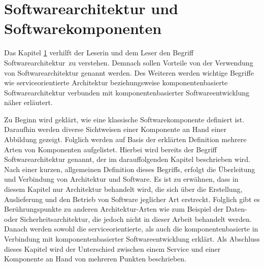 \section{Softwarearchitektur und Softwarekomponenten}
\label{sec:2_Architektur}
Das Kapitel \ref{sec:2_Architektur} verhilft der Leserin und dem Leser den Begriff \glqq Softwarearchitektur\grqq\ zu verstehen. Demnach sollen Vorteile von der Verwendung von Softwarearchitektur genannt werden. Des Weiteren werden wichtige Begriffe wie serviceorientierte Architektur beziehungsweise komponentenbasierte Softwarearchitektur verbunden mit komponentenbasierter Softwareentwicklung näher erläutert.

Zu Beginn wird geklärt, wie eine klassische Softwarekomponente definiert ist. Daraufhin werden diverse Sichtweisen einer Komponente an Hand einer Abbildung gezeigt. Folglich werden auf Basis der erklärten Definition mehrere Arten von Komponenten aufgelistet. Hierbei wird bereits der Begriff Softwarearchitektur genannt, der im darauffolgenden Kapitel beschrieben wird. Nach einer kurzen, allgemeinen Definition dieses Begriffs, erfolgt die Überleitung und Verbindung von Architektur und Software. Es ist zu erwähnen, dass in diesem Kapitel nur Architektur behandelt wird, die sich über die Erstellung, Auslieferung und den Betrieb von Software jeglicher Art erstreckt. Folglich gibt es Berührungspunkte zu anderen Architektur-Arten wie zum Beispiel der Daten- oder Sicherheitsarchitektur, die jedoch nicht in dieser Arbeit behandelt werden.
Danach werden sowohl die serviceorientierte, als auch die komponentenbasierte in Verbindung mit komponentenbasierter Softwareentwicklung erklärt. Als Abschluss dieses Kapitel wird der Unterschied zwischen einem Service und einer Komponente an Hand von mehreren Punkten beschrieben.